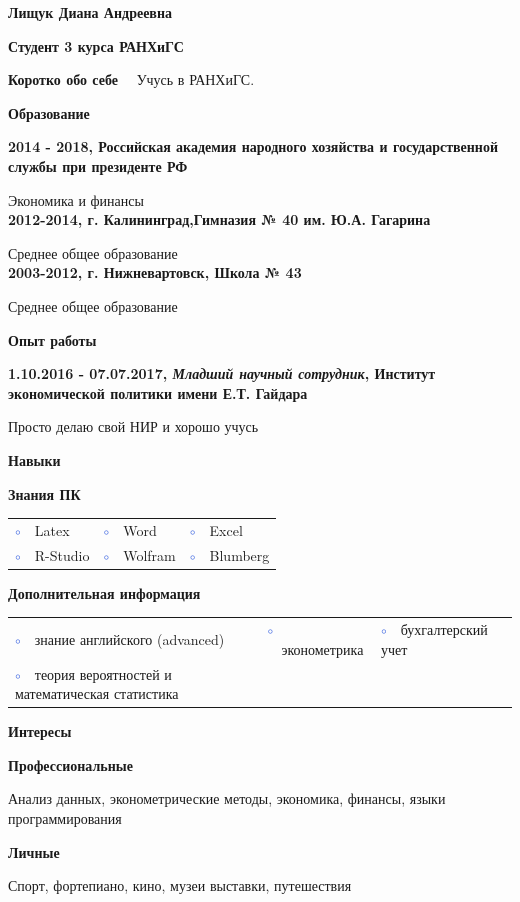 \documentclass[12pt,a4paper]{memoir}
\newcommand{\userinformation}[1]{\renewcommand{\userinformation}{#1}} %
\newcommand{\cvheading}[1]{{\Huge\bfseries\color{RoyalBlue} #1} \par\vspace{.6\baselineskip}} %
\newcommand{\cvsubheading}[1]{{\Large\bfseries #1} \bigbreak} %
\newcommand{\Sep}{\vspace{1em}} %
\newcommand{\SmallSep}{\vspace{0.5em}} %
\newcommand{\aboutme}[2]{ %
	\textbf{\color{RoyalBlue} #1}~~#2\par\Sep
}
\newcommand{\CVSection}[1]{ %
	{\Large\textbf{#1}}\par
	\SmallSep %
}
\newcommand{\CVItem}[2]{ %
	\textbf{\color{RoyalBlue} #1}\par
	#2
	\SmallSep %
}
\newcommand{\bluebullet}{\textcolor{RoyalBlue}{$\circ$}~~} %
\begin{document}
\userinformation 

\framebreak 


\cvheading{Лищук Диана Андреевна} 

\cvsubheading{Студент 3 курса РАНХиГС}


\aboutme{Коротко обо себе}{ Учусь в РАНХиГС. }


\CVSection{Образование}


\CVItem{2014 - 2018, Российская академия народного хозяйства и государственной службы при президенте РФ}{Экономика и финансы}\\
\CVItem{2012-2014, г. Калининград,Гимназия № 40 им. Ю.А. Гагарина} {Среднее общее образование}\\
\CVItem{2003-2012, г. Нижневартовск, Школа № 43} {Среднее общее образование}

\Sep 

\CVSection{Опыт работы}

\CVItem{1.10.2016 - 07.07.2017, \textit{Младший научный сотрудник}, Институт экономической политики имени Е.Т. Гайдара}{Просто делаю свой НИР и хорошо учусь}


\Sep 


\CVSection{Навыки}

\CVItem{Знания ПК}
{\begin{tabular}{p{} p{0.2\textwidth} p{0.2\textwidth}}
\bluebullet Latex &  \bluebullet Word & \bluebullet Excel\\
\bluebullet R-Studio &  \bluebullet Wolfram &  \bluebullet Blumberg\\
\end{tabular}}

\CVItem{Дополнительная информация}
{\begin{tabular}{p{0.2\textwidth} p{0.2\textwidth} p{0.2\textwidth}}
		\bluebullet знание английского (advanced) &  \bluebullet эконометрика & 
		\bluebullet бухгалтерский учет\\ \bluebullet теория вероятностей и математическая статистика \\
\end{tabular}}


\CVSection{Интересы}


\CVItem{Профессиональные}{Анализ данных, эконометрические методы, экономика, финансы, языки программирования}

\CVItem{Личные}{Спорт, фортепиано, кино, музеи выставки, путешествия}


\Sep %
\end{document}
